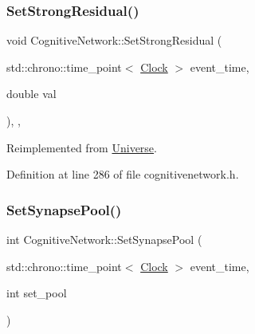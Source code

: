 \mbox{\label{class_cognitive_network_a6f7210dd8c2786518329faa61b6e14d5}} 
\subsubsection{\texorpdfstring{Set\+Strong\+Residual()}{SetStrongResidual()}}
{\footnotesize\ttfamily void Cognitive\+Network\+::\+Set\+Strong\+Residual (\begin{DoxyParamCaption}\item[{std\+::chrono\+::time\+\_\+point$<$ \hyperlink{universe_8h_a0ef8d951d1ca5ab3cfaf7ab4c7a6fd80}{Clock} $>$}]{event\+\_\+time,  }\item[{double}]{val }\end{DoxyParamCaption})\hspace{0.3cm}{\ttfamily [inline]}, {\ttfamily [final]}, {\ttfamily [virtual]}}



Reimplemented from \hyperlink{class_universe_a1b2d6197ddf3d613cc30bd04d22ed8b7}{Universe}.



Definition at line 286 of file cognitivenetwork.\+h.

\mbox{\label{class_cognitive_network_a30f35d1bff2e1e3a5a2d921791cfe6b8}} 
\subsubsection{\texorpdfstring{Set\+Synapse\+Pool()}{SetSynapsePool()}}
{\footnotesize\ttfamily int Cognitive\+Network\+::\+Set\+Synapse\+Pool (\begin{DoxyParamCaption}\item[{std\+::chrono\+::time\+\_\+point$<$ \hyperlink{universe_8h_a0ef8d951d1ca5ab3cfaf7ab4c7a6fd80}{Clock} $>$}]{event\+\_\+time,  }\item[{int}]{set\+\_\+pool }\end{DoxyParamCaption})\hspace{0.3cm}{\ttfamily [inline]}}



